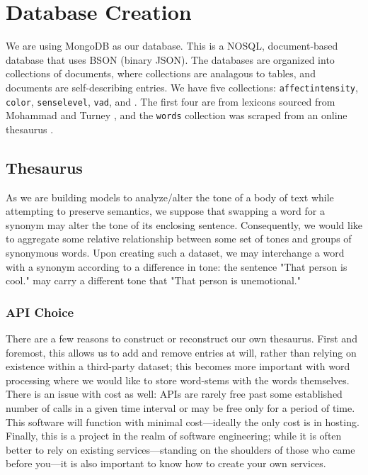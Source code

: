 \documentclass[11pt, twoside, reqno]{book}
\begin{document}
\chapter{Database Creation}

We are using MongoDB \cite{Themostp65:online} as our database. This is a NOSQL, document-based database that uses BSON (binary JSON). The databases are organized into collections of documents, where collections are analagous to tables, and documents are self-describing entries. We have five collections: \texttt{affectintensity}, \texttt{color}, \texttt{senselevel}, \texttt{vad}, and . The first four are from lexicons sourced from Mohammad and Turney \cite{Mohammad13}, and the \texttt{words} collection was scraped from an online thesaurus \cite{BigHugeT88:online}.

\section{Thesaurus}

As we are building models to analyze/alter the tone of a body of text while attempting to preserve semantics, we suppose that swapping a word for a synonym may alter the tone of its enclosing sentence. Consequently, we would like to aggregate some relative relationship between some set of tones and groups of synonymous words. Upon creating such a dataset, we may interchange a word with a synonym according to a difference in tone: the sentence "That person is cool." may carry a different tone that "That person is unemotional."

\subsection{API Choice}


There are a few reasons to construct or reconstruct our own thesaurus. First and foremost, this allows us to add and remove entries at will, rather than relying on existence within a third-party dataset; this becomes more important with word processing where we would like to store word-stems with the words themselves. There is an issue with cost as well: APIs are rarely free past some established number of calls in a given time interval or may be free only for a period of time. This software will function with minimal cost—ideally the only cost is in hosting. Finally, this is a project in the realm of software engineering; while it is often better to rely on existing services—standing on the shoulders of those who came before you—it is also important to know how to create your own services.
\end{document}
